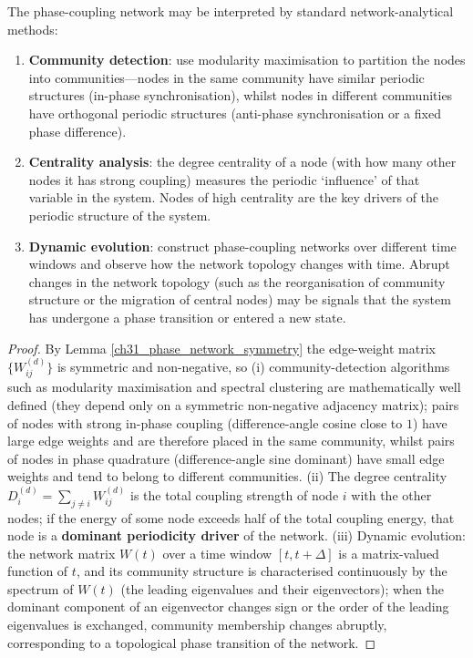 \begin{proposition}\label{prop:phase_network_analysis}
The phase-coupling network may be interpreted by standard network-analytical methods:
\begin{enumerate}[label=(\roman*)]
    \item \textbf{Community detection}: use modularity maximisation to partition the nodes into communities---nodes in the same community have similar periodic structures (in-phase synchronisation), whilst nodes in different communities have orthogonal periodic structures (anti-phase synchronisation or a fixed phase difference).
    \item \textbf{Centrality analysis}: the degree centrality of a node (with how many other nodes it has strong coupling) measures the periodic `influence' of that variable in the system. Nodes of high centrality are the key drivers of the periodic structure of the system.
    \item \textbf{Dynamic evolution}: construct phase-coupling networks over different time windows and observe how the network topology changes with time. Abrupt changes in the network topology (such as the reorganisation of community structure or the migration of central nodes) may be signals that the system has undergone a phase transition or entered a new state.
\end{enumerate}
\end{proposition}

\begin{proof}
By Lemma \ref{ch31_phase_network_symmetry} the edge-weight matrix $\{W_{ij}^{(d)}\}$ is symmetric and non-negative, so (i) community-detection algorithms such as modularity maximisation and spectral clustering are mathematically well defined (they depend only on a symmetric non-negative adjacency matrix); pairs of nodes with strong in-phase coupling (difference-angle cosine close to $1$) have large edge weights and are therefore placed in the same community, whilst pairs of nodes in phase quadrature (difference-angle sine dominant) have small edge weights and tend to belong to different communities. (ii) The degree centrality $D_i^{(d)} = \sum_{j \neq i} W_{ij}^{(d)}$ is the total coupling strength of node $i$ with the other nodes; if the energy of some node exceeds half of the total coupling energy, that node is a \textbf{dominant periodicity driver} of the network. (iii) Dynamic evolution: the network matrix $W(t)$ over a time window $[t, t+\Delta]$ is a matrix-valued function of $t$, and its community structure is characterised continuously by the spectrum of $W(t)$ (the leading eigenvalues and their eigenvectors); when the dominant component of an eigenvector changes sign or the order of the leading eigenvalues is exchanged, community membership changes abruptly, corresponding to a topological phase transition of the network.
\end{proof}

